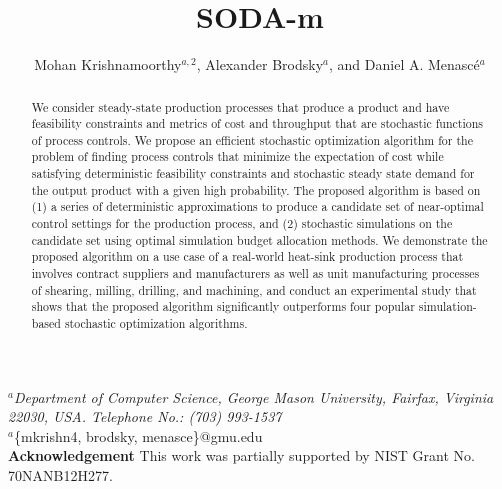 \documentclass[a4paper, 12pt]{article} %
\title{\textbf{SODA-m}} %
\author{Mohan Krishnamoorthy$^{a,2}$, Alexander Brodsky$^a$, and Daniel A. Menasc\'e$^{a}$} %
\makeatletter
\renewcommand{\maketitle}{ %
\begin{flushleft} 
{\large\@title\footnotemark[1]} %

\vspace{20pt} %

{\large\@author} %
\end{flushleft}
}
\makeatother
\begin{document}
\maketitle %

\begin{flushleft} 
\vspace{10pt}
$^a$\textit{Department of Computer Science, George Mason University, Fairfax, Virginia 22030, USA. Telephone No.: (703) 993-1537}\\
\vspace{20pt}
$^a$\{mkrishn4, brodsky, menasce\}@gmu.edu \\
\vspace{20pt}
\textbf{Acknowledgement}\newline
This work was partially supported by NIST Grant No. 70NANB12H277. \newline
\vspace{20pt}
\end{flushleft} 

\newpage
{\large \@title }
\vspace{10pt}


\begin{abstract}{\small\noindent
We consider steady-state production processes that produce a product and have feasibility constraints and metrics of cost and throughput that are stochastic functions of process controls. We propose an efficient stochastic optimization algorithm for the problem of finding process controls that minimize the expectation of cost while satisfying deterministic feasibility constraints and stochastic steady state demand for the output product with a given high probability. The proposed algorithm is based on (1) a series of deterministic approximations to produce a candidate set of near-optimal control settings for the production process, and (2) stochastic simulations on the candidate set using optimal simulation budget allocation methods. We demonstrate the proposed  algorithm on a use case of a real-world heat-sink production process that involves contract suppliers and manufacturers as well as unit manufacturing processes of shearing, milling, drilling, and machining, and conduct an experimental study that shows that the proposed algorithm significantly outperforms four popular simulation-based stochastic optimization algorithms.
}
\end{abstract}
\end{document}
